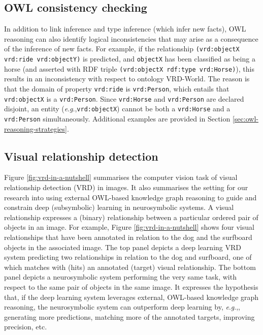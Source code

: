 \documentclass[]{jair}
\newcommand{\eg}{\textit{e}.\textit{g}.,\xspace}
\begin{document}
\subsection{OWL consistency checking}
In addition to link inference and type inference (which infer new facts), OWL reasoning can also identify logical inconsistencies that may arise as a consequence of the inference of new facts.
For example, if the relationship \texttt{(vrd:objectX vrd:ride vrd:objectY)} is predicted, and \texttt{objectX} has been classified as being a horse (and asserted with RDF triple \texttt{(vrd:objectX rdf:type vrd:Horse)}), this results in an inconsistency with respect to ontology VRD-World. The reason is that the domain of property \texttt{vrd:ride} is \texttt{vrd:Person}, which entails that \texttt{vrd:objectX} is a \texttt{vrd:Person}. Since \texttt{vrd:Horse} and \texttt{vrd:Person} are declared disjoint, an entity (\eg \texttt{vrd:objectX}) cannot be both a \texttt{vrd:Horse} and a \texttt{vrd:Person} simultaneously.
Additional examples are provided in Section \ref{sec:owl-reasoning-strategies}.

\subsection{Visual relationship detection}
Figure \ref{fig:vrd-in-a-nutshell} summarises the computer vision task of visual relationship detection (VRD) in images.
It also summarises the setting for our research into using external OWL-based knowledge graph reasoning to guide and constrain deep (subsymbolic) learning in neurosymbolic systems.
A visual relationship expresses a (binary) relationship between a particular ordered pair of objects in an image.
For example, Figure \ref{fig:vrd-in-a-nutshell} shows four visual relationships that have been annotated in relation to the dog and the surfboard objects in the associated image.
The top panel depicts a deep learning VRD system predicting two relationships in relation to the dog and surfboard, one of which matches with (hits) an annotated (target) visual relationship.
The bottom panel depicts a neurosymbolic system performing the very same task, with respect to the same pair of objects in the same image.
It expresses the hypothesis that, if the deep learning system leverages external, OWL-based knowledge graph reasoning, the neurosymbolic system can outperform deep learning by, \eg, generating more predictions, matching more of the annotated targets, improving precision, etc.
\end{document}
